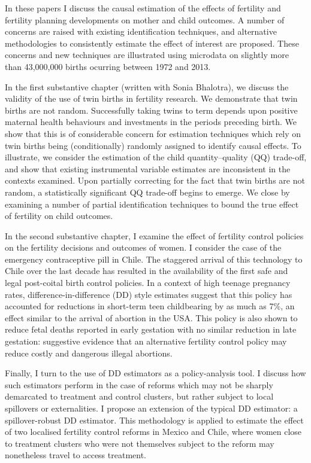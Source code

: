 In these papers I discuss the causal estimation of the effects of fertility and
fertility planning developments on mother and child outcomes. A number of 
concerns are raised with existing identification techniques, and alternative 
methodologies to consistently estimate the effect of interest are proposed.  
These concerns and new techniques are illustrated using microdata on slightly 
more than 43,000,000 births ocurring between 1972 and 2013.

In the first substantive chapter (written with Sonia Bhalotra), we discuss the 
validity of the use of twin births in fertility research.  We demonstrate that 
twin births are not random.  Successfully taking twins to term depends upon 
positive maternal health behaviours and investments in the periods preceding 
birth. We show that this is of considerable concern for estimation techniques 
which rely on twin births being (conditionally) randomly assigned to identify 
causal effects.  To illustrate, we consider the estimation of the child 
quantity--quality (QQ) trade-off, and show that existing instrumental variable 
estimates are inconsistent in the contexts examined. Upon partially correcting 
for the fact that twin births are not random, a statistically significant QQ 
trade-off begins to emerge.  We close by examining a number of partial 
identification techniques to bound the true effect of fertility on child 
outcomes.

In the second substantive chapter, I examine the effect of fertility control 
policies on the fertility decisions and outcomes of women.  I consider the case 
of the emergency contraceptive pill in Chile.  The staggered arrival of this
technology to Chile over the last decade has resulted in the availability of the 
first safe and legal post-coital birth control policies.  In a context of high
teenage pregnancy rates, difference-in-difference (DD) style estimates suggest 
that this policy has accounted for reductions in short-term teen childbearing 
by as much as 7\%, an effect similar to the arrival of abortion in the USA.  
This policy is also shown to reduce fetal deaths reported in early gestation 
with no similar reduction in late gestation: suggestive evidence that an
alternative fertility control policy may reduce costly and dangerous illegal 
abortions.

Finally, I turn to the use of DD estimators as a policy-analysis tool.  I discuss
how such estimators perform in the case of reforms which may not be sharply 
demarcated to treatment and control clusters, but rather subject to local 
spillovers or externalities.  I propose an extension of the typical DD estimator: 
a spillover-robust DD estimator.  This methodology is applied to estimate the 
effect of two localised fertility control reforms in Mexico and Chile, where 
women close to treatment clusters who were not themselves subject to the reform 
may nonetheless travel to access treatment. 

